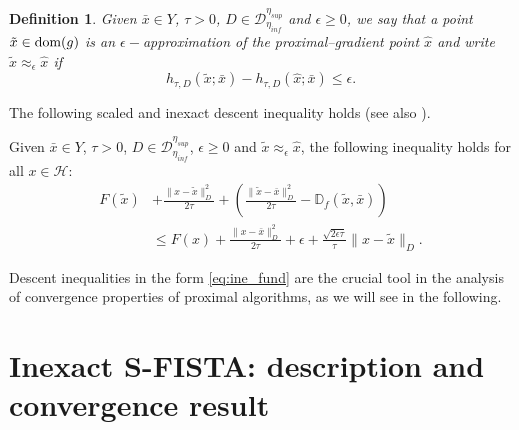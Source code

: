 \documentclass[conference]{IEEEtran}
\newtheorem{definition}{Definition}
\begin{document}
\begin{definition}  \label{def:eps_approx}
Given $\bar{x}\in Y$, $\tau>0$, $D\in \mathcal{D}_{\eta_{inf}}^{\eta_{sup}}$ and $\epsilon\geq 0$, we say that a point $\tilde{x}\in\mbox{dom}(g)$ is an $\epsilon-$approximation of the proximal--gradient point $\hat{x}$ and write $\tilde{x}\approx_\epsilon \hat{x}$ if 
\begin{equation}\label{eq:eps_approx}
h_{\tau,D}(\tilde{x};\bar{x})-h_{\tau,D}(\hat{x};\bar{x})\leq \epsilon.
\end{equation}
\end{definition}


The following scaled and inexact descent inequality holds (see also \cite[Lemma 2.3]{Bonettini2018a}).

\begin{Lemma}\label{lem:technical}
Given $\bar{x}\in Y$, $\tau>0$, $D\in \mathcal{D}_{\eta_{inf}}^{\eta_{sup}}$, $\epsilon\geq 0$ and $\tilde{x}\approx_\epsilon \hat{x}$,  the following inequality holds for all $x\in\mathcal{H}$:
\begin{align}\label{eq:ine_fund}
F(\tilde{x})& +\frac{\|x-\tilde{x}\|_D^2}{2\tau}+\left(\frac{\|\tilde{x}-\bar{x}\|_D^2}{2\tau}-\mathbb{D}_f(\tilde{x},\bar{x})\right) \\ 
& \leq F(x)+\frac{\|x-\bar{x}\|_D^2}{2\tau}
+\epsilon+\frac{\sqrt{2\epsilon\tau}}{\tau}\|x-\tilde{x}\|_D.
\end{align}
\end{Lemma}
Descent inequalities in the form \eqref{eq:ine_fund} are the crucial tool in the analysis of convergence properties of proximal algorithms, as we will see in the following.

\section{Inexact S-FISTA: description and convergence result}
\end{document}
